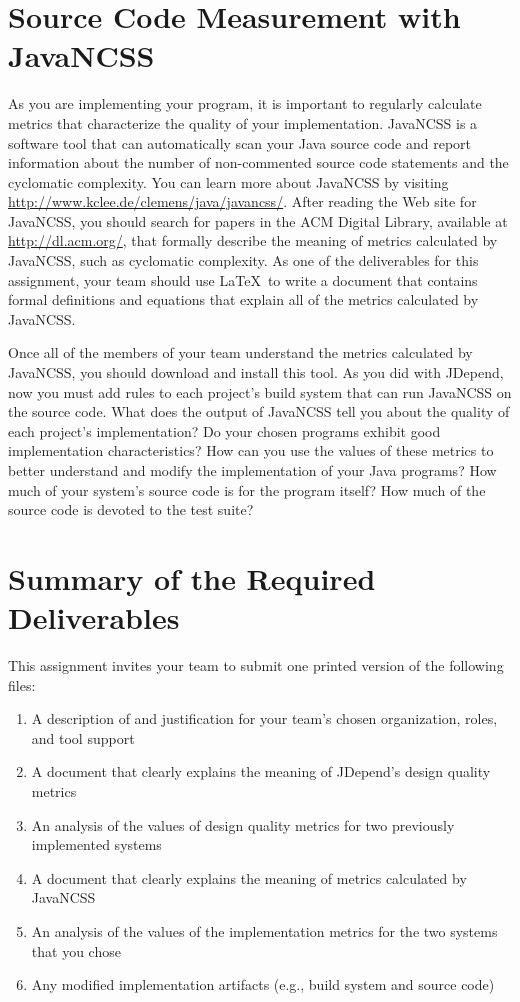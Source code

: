 \section*{Source Code Measurement with JavaNCSS}

As you are implementing your program, it is important to regularly calculate metrics that characterize the quality of
your implementation.  JavaNCSS is a software tool that can automatically scan your Java source code and report
information about the number of non-commented source code statements and the cyclomatic complexity.  You can learn more
about JavaNCSS by visiting \url{http://www.kclee.de/clemens/java/javancss/}. After reading the Web site for JavaNCSS,
you should search for papers in the ACM Digital Library, available at \url{http://dl.acm.org/}, that formally describe
the meaning of metrics calculated by JavaNCSS, such as cyclomatic complexity. As one of the deliverables for this
assignment, your team should use \LaTeX\ to write a document that contains formal definitions and equations that explain
all of the metrics calculated by JavaNCSS.  

Once all of the members of your team understand the metrics calculated by JavaNCSS, you should download and install
this tool.  As you did with JDepend, now you must add rules to each project's build system that can run JavaNCSS on the
source code. What does the output of JavaNCSS tell you about the quality of each project's implementation? Do your
chosen programs exhibit good implementation characteristics? How can you use the values of these metrics to better
understand and modify the implementation of your Java programs? How much of your system's source code is for the
program itself? How much of the source code is devoted to the test suite?

\section*{Summary of the Required Deliverables}

This assignment invites your team to submit one printed version of the following files:
\vspace*{-.1in}
\begin{enumerate}
	\item A description of and justification for your team's chosen organization, roles, and tool support
	\item A document that clearly explains the meaning of JDepend's design quality metrics 
	\item An analysis of the values of design quality metrics for two previously implemented systems 
	\item A document that clearly explains the meaning of metrics calculated by JavaNCSS
	\item An analysis of the values of the implementation metrics for the two systems that you chose
	\item Any modified implementation artifacts (e.g., build system and source code) 
\end{enumerate}
\vspace*{-.1in}

